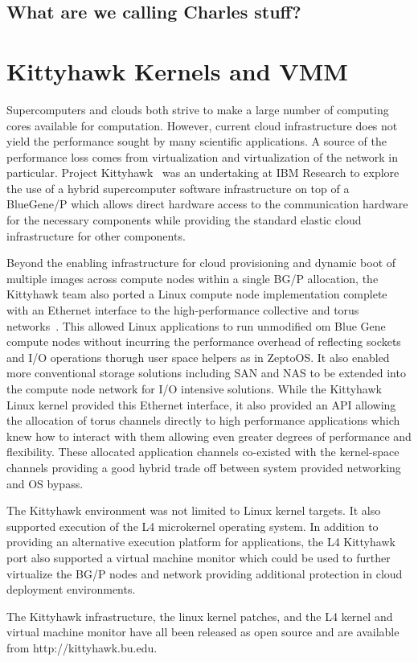 \subsection{What are we calling Charles stuff?}
\section{Kittyhawk Kernels and VMM}

Supercomputers and clouds both strive to make a large number of 
computing cores available for computation. 
However, current cloud infrastructure does not yield the performance 
sought by many scientific applications. A source of the performance 
loss comes from virtualization and virtualization of the network in 
particular. 
Project Kittyhawk~\cite{kh-sciencecloud} was an undertaking at IBM Research 
to explore the use of a hybrid supercomputer software infrastructure
on top of a BlueGene/P which allows direct hardware access to the 
communication hardware for the necessary components while providing 
the standard elastic cloud infrastructure for other components.

Beyond the enabling infrastructure for cloud provisioning and dynamic
boot of multiple images across compute nodes within a single BG/P
allocation, the Kittyhawk team also ported a Linux compute node
implementation complete with an Ethernet interface to the high-performance
collective and torus networks~\cite{kh-systemsjournal}.  
This allowed Linux applications to run unmodified om Blue Gene compute 
nodes without incurring the performance 
overhead of reflecting sockets and I/O operations thorugh user space
helpers as in ZeptoOS.  It also enabled more conventional storage solutions
including SAN and NAS to be extended into the compute node network for
I/O intensive solutions.  While the Kittyhawk Linux kernel provided this
Ethernet interface, it also provided an API allowing the allocation of
torus channels directly to high performance applications which knew how to
interact with them allowing even greater degrees of performance and flexibility.
These allocated application channels co-existed with the kernel-space channels
providing a good hybrid trade off between system provided networking and
OS bypass.

The Kittyhawk environment was not limited to Linux kernel targets.  
It also supported execution of the L4 microkernel operating system.  
In addition to providing an alternative execution platform for applications,
the L4 Kittyhawk port also supported a virtual machine monitor which could
be used to further virtualize the BG/P nodes and network providing additional
protection in cloud deployment environments.

The Kittyhawk infrastructure, the linux kernel patches, and the L4 kernel
and virtual machine monitor have all been released as open source and are
available from http://kittyhawk.bu.edu.
